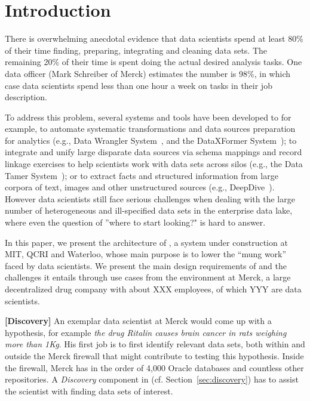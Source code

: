 \section{Introduction}
\label{introduction}

There is overwhelming anecdotal evidence that data scientists spend at least
80\% of their time finding, preparing, integrating and cleaning data sets.
The remaining 20\% of their time is spent doing the actual desired analysis
tasks.
One data officer (Mark Schreiber
of Merck) estimates the number is 98\%, in which case data
scientists spend less than one hour a week on tasks in their job description.


To address this problem, several systems and tools have been developed to for example,  to automate systematic transformations and data sources preparation for analytics (e.g., Data Wrangler System~\cite{2011-wrangler}, and the DataXFormer System~\cite{DBLP:conf/icde/AbedjanMIOPS16}); to integrate and unify large disparate data sources via schema mappings and record linkage exercises to help scientists work with data sets across silos (e.g., the Data Tamer System~\cite{DBLP:conf/cidr/StonebrakerBIBCZPX13}); or to extract facts and structured information from large corpora of text, images and other unstructured sources (e.g., DeepDive~\cite{DBLP:journals/pvldb/ShinWWSZR15}). However data scientists still face serious challenges when dealing with the large number of heterogeneous and ill-specified data sets in the enterprise data lake, where even the question of ''where to start looking?" is hard to answer. 

In this paper, we present the architecture of \dcv, a system under construction
at MIT, QCRI and Waterloo, whose main purpose  is to lower the ``mung work''  faced by
data scientists.  We present the main  design requirements of \dcv and the challenges it entails through use cases from the environment at Merck,  a large decentralized drug company with about XXX employees, of which YYY are data scientists.


{\bf[Discovery]} An exemplar data scientist at Merck would come up with a hypothesis, for example {\it the drug Ritalin causes brain cancer in rats weighing more than 1Kg}.  His first job is to first identify relevant data sets, both within and outside the Merck firewall that might contribute to testing this hypothesis.  Inside the firewall, Merck has in the order of  4,000 Oracle databases and countless other repositories.  A {\it Discovery} component in \dcv (cf. Section~\ref{sec:discovery}) has to assist the scientist with finding data sets of interest.

